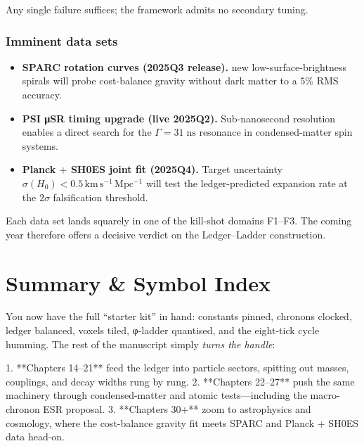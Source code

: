 \documentclass[11pt,oneside]{book}
\begin{document}
Any single failure suffices; the framework admits no secondary tuning.

\subsubsection{Imminent data sets}
\label{subsubsec:data-sets}
\begin{itemize}
  \item \textbf{SPARC rotation curves (2025Q3 release).} new low-surface-brightness spirals will probe
        cost-balance gravity without dark matter
        to a \(5\%\) RMS accuracy.
  \item \textbf{PSI μSR timing upgrade (live 2025Q2).}\;
        Sub-nanosecond resolution enables a direct
        search for the \(\Gamma = 31\;\text{ns}\) resonance
        in condensed-matter spin systems.
  \item \textbf{Planck $\boldsymbol{+}$ SH0ES joint fit (2025Q4).}\;
        Target uncertainty \(\sigma(H_{0})\!<\!0.5\,\mathrm{km\,s^{-1}\,Mpc^{-1}}\)
        will test the ledger-predicted expansion rate at the
        \(2\sigma\) falsification threshold.
\end{itemize}

Each data set lands squarely in one of the kill-shot domains F1–F3.
The coming year therefore offers a decisive verdict on the
Ledger–Ladder construction.

\section{Summary \& Symbol Index}
\label{sec:symbol-index}


You now have the full “starter kit” in hand:  
constants pinned, chronons clocked, ledger balanced, voxels tiled, φ-ladder
quantised, and the eight-tick cycle humming.  
The rest of the manuscript simply \emph{turns the handle}:

1. **Chapters 14–21** feed the ledger into particle sectors, spitting out
   masses, couplings, and decay widths rung by rung.  
2. **Chapters 22–27** push the same machinery through condensed-matter and
   atomic tests—including the macro-chronon ESR proposal.  
3. **Chapters 30+** zoom to astrophysics and cosmology, where the cost-balance
   gravity fit meets SPARC and Planck + SH0ES data head-on.
\end{document}
